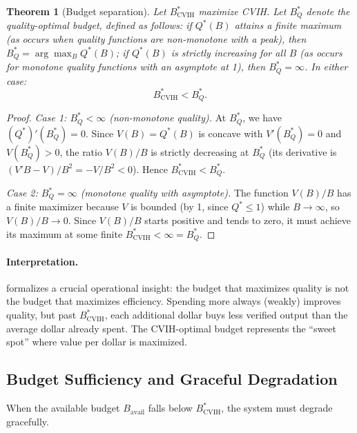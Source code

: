 \documentclass[11pt, a4paper, copyright]{googledeepmind}
\newtheorem{theorem}{Theorem}[section]
\begin{document}
\begin{theorem}[Budget separation]\label{thm:budget-separation}
Let $B^*_{\text{CVIH}}$ maximize CVIH. Let $B^*_Q$ denote the quality-optimal budget, defined as follows: if $Q^*(B)$ attains a finite maximum (as occurs when quality functions are non-monotone with a peak), then $B^*_Q = \arg\max_B Q^*(B)$; if $Q^*(B)$ is strictly increasing for all $B$ (as occurs for monotone quality functions with an asymptote at 1), then $B^*_Q = \infty$. In either case:
\begin{equation}\label{eq:budget-sep}
    B^*_{\text{CVIH}} < B^*_Q.
\end{equation}
\end{theorem}

\begin{proof}
\emph{Case 1: $B^*_Q < \infty$ (non-monotone quality).} At $B^*_Q$, we have $(Q^*)'(B^*_Q) = 0$. Since $V(B) = Q^*(B)$ is concave with $V'(B^*_Q) = 0$ and $V(B^*_Q) > 0$, the ratio $V(B)/B$ is strictly decreasing at $B^*_Q$ (its derivative is $(V'B - V)/B^2 = -V/B^2 < 0$). Hence $B^*_{\text{CVIH}} < B^*_Q$.

\emph{Case 2: $B^*_Q = \infty$ (monotone quality with asymptote).} The function $V(B)/B$ has a finite maximizer because $V$ is bounded (by 1, since $Q^* \leq 1$) while $B \to \infty$, so $V(B)/B \to 0$. Since $V(B)/B$ starts positive and tends to zero, it must achieve its maximum at some finite $B^*_{\text{CVIH}} < \infty = B^*_Q$.
\end{proof}

\paragraph{Interpretation.}
 formalizes a crucial operational insight: the budget that maximizes quality is not the budget that maximizes efficiency. Spending more always (weakly) improves quality, but past $B^*_{\text{CVIH}}$, each additional dollar buys less verified output than the average dollar already spent. The CVIH-optimal budget represents the ``sweet spot'' where value per dollar is maximized.

\subsection{Budget Sufficiency and Graceful Degradation}

When the available budget $B_{\text{avail}}$ falls below $B^*_{\text{CVIH}}$, the system must degrade gracefully.
\end{document}
